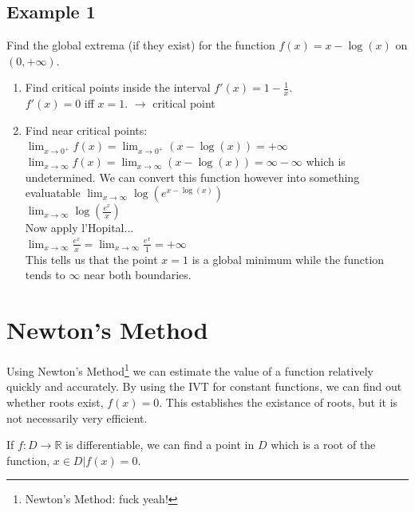 \subsection{Example 1}
Find the global extrema (if they exist) for the function
$f(x) = x - \log(x)$ on $(0,+\infty)$.

\begin{enumerate}
  \item Find critical points inside the interval
  $f'(x) = 1 - \frac{1}{x}$. \\
  $f'(x) = 0$ iff $x=1$. $\to$ critical point \\
  \item Find near critical points: \\
  $\lim_{x \to 0^+} f(x) = \lim_{x \to 0^+} (x - \log(x)) = +\infty$ \\
  $\lim_{x \to \infty} f(x) = \lim_{x \to \infty} (x - \log(x)) = \infty - \infty$
  which is undetermined. We can convert this function however into something evaluatable
  $\lim_{x \to \infty} \log(e^{x - \log(x)})$ \\
  $\lim_{x \to \infty} \log(\frac{e^x}{x})$ \\
  Now apply l'Hopital... \\
  $\lim_{x \to \infty} \frac{e^x}{x} = \lim_{x \to \infty} \frac{e^x}{1} = +\infty$\\
  This tells us that the point $x=1$ is a global minimum while the function
  tends to $\infty$ near both boundaries.
\end{enumerate}

\section{Newton's Method}
Using Newton's Method\footnote{Newton's Method: fuck yeah!} we can estimate the
value of a function relatively quickly and accurately. By using the IVT for
constant functions, we can find out whether roots exist, $f(x)=0$. This
establishes the existance of roots, but it is not necessarily very efficient.

\noindent If $f: D \to \mathbb{R}$ is differentiable, we can find a point in $D$
which is a root of the function, $x \in D | f(x) = 0$.

